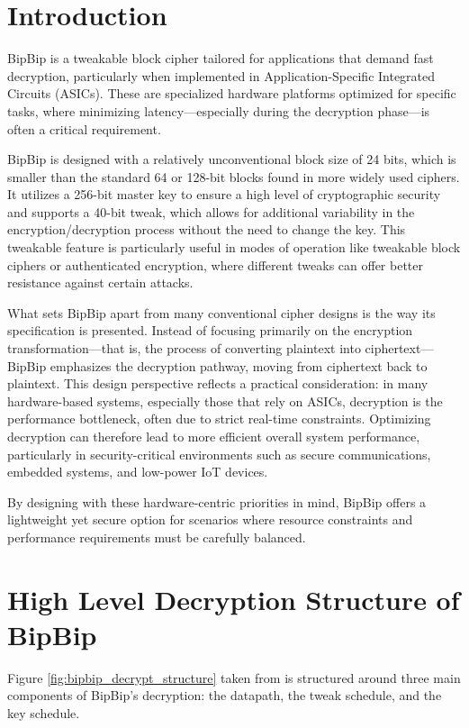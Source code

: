 \section{Introduction}
BipBip is a tweakable block cipher tailored for applications that demand fast decryption, particularly when implemented in Application-Specific Integrated Circuits (ASICs). These are specialized hardware platforms optimized for specific tasks, where minimizing latency—especially during the decryption phase—is often a critical requirement.

BipBip is designed with a relatively unconventional block size of 24 bits, which is smaller than the standard 64 or 128-bit blocks found in more widely used ciphers. It utilizes a 256-bit master key to ensure a high level of cryptographic security and supports a 40-bit tweak, which allows for additional variability in the encryption/decryption process without the need to change the key. This tweakable feature is particularly useful in modes of operation like tweakable block ciphers or authenticated encryption, where different tweaks can offer better resistance against certain attacks.

What sets BipBip apart from many conventional cipher designs is the way its specification is presented. Instead of focusing primarily on the encryption transformation—that is, the process of converting plaintext into ciphertext—BipBip emphasizes the decryption pathway, moving from ciphertext back to plaintext. This design perspective reflects a practical consideration: in many hardware-based systems, especially those that rely on ASICs, decryption is the performance bottleneck, often due to strict real-time constraints. Optimizing decryption can therefore lead to more efficient overall system performance, particularly in security-critical environments such as secure communications, embedded systems, and low-power IoT devices.

By designing with these hardware-centric priorities in mind, BipBip offers a lightweight yet secure option for scenarios where resource constraints and performance requirements must be carefully balanced.

\section{High Level Decryption Structure of BipBip}

Figure \ref{fig:bipbip_decrypt_structure} taken from \cite{Belkheyar_Daemen_Dobraunig_Ghosh_Rasoolzadeh_2022} is structured around three main components of BipBip's decryption: the datapath, the tweak schedule, and the key schedule.

